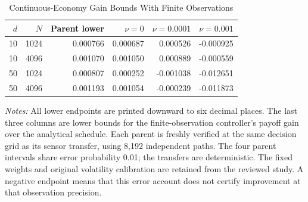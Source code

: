 \begin{table}[!htbp]
\centering
\caption{Continuous-Economy Gain Bounds With Finite Observations}
\label{tab:r15observation}
\footnotesize
\begin{tabular}{rrrrrr}
\toprule
$d$ & $N$ & Parent lower & $\nu=0$ & $\nu=0.0001$ & $\nu=0.001$ \\
\midrule
10 & 1024 & 0.000766 & 0.000687 & 0.000526 & -0.000925 \\
10 & 4096 & 0.001070 & 0.001050 & 0.000889 & -0.000559 \\
50 & 1024 & 0.000807 & 0.000252 & -0.001038 & -0.012651 \\
50 & 4096 & 0.001193 & 0.001054 & -0.000239 & -0.011873 \\
\bottomrule
\end{tabular}
\begin{minipage}{0.96\linewidth}\footnotesize
\emph{Notes:} All lower endpoints are printed downward to six decimal places.
The last three columns are lower bounds for the finite-observation
controller's payoff gain over the analytical schedule. Each parent is freshly
verified at the same decision grid as its sensor transfer, using 8,192 independent
paths. The four parent intervals share error probability 0.01; the transfers are
deterministic. The fixed weights and original volatility calibration are retained
from the reviewed study. A negative endpoint means that this error account does
not certify improvement at that observation precision.
\end{minipage}
\end{table}

